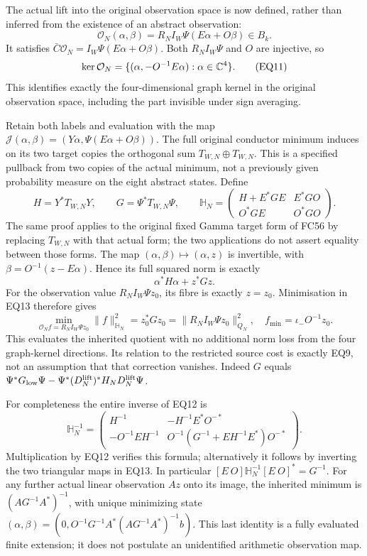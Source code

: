 \documentclass[11pt]{article}
\begin{document}
The actual lift into the original observation space is now defined,
rather than inferred from the existence of an abstract observation:
\[
 \mathcal O_N(\alpha,\beta)=R_NI_W\Psi(E\alpha+O\beta)\in B_k.
                                                                    \tag{EQ10}
\]
It satisfies $\bar C\mathcal O_N=I_W\Psi(E\alpha+O\beta)$.
Both $R_NI_W\Psi$ and $O$ are injective, so
\[
 \ker\mathcal O_N=\{(\alpha,-O^{-1}E\alpha):\alpha\in\mathbb C^4\}.
                                                                    \tag{EQ11}
\]
This identifies exactly the four-dimensional graph kernel in the
original observation space, including the part invisible under sign
averaging.

Retain both labels and evaluation with the map
$\mathcal J(\alpha,\beta)=(Y\alpha,\Psi(E\alpha+O\beta))$.
The full original conductor minimum induces on its two target copies
the orthogonal sum $T_{W,N}\oplus T_{W,N}$. This is a specified
pullback from two copies of the actual minimum, not a previously
given probability measure on the eight abstract states. Define
\[
 H=Y^*T_{W,N}Y,\qquad G=\Psi^*T_{W,N}\Psi,
 \qquad
 \mathbb H_N=\begin{pmatrix}
 H+E^*GE&E^*GO\\O^*GE&O^*GO
 \end{pmatrix}.                                                     \tag{EQ12}
\]
The same proof applies to the original fixed Gamma target form
of FC56 by replacing $T_{W,N}$ with that actual form; the two
applications do not assert equality between those forms.
The map $(\alpha,\beta)\mapsto(\alpha,z)$ is invertible, with
$\beta=O^{-1}(z-E\alpha)$. Hence its full squared norm is exactly
\[
 \alpha^*H\alpha+z^*Gz.                                             \tag{EQ13}
\]
For the observation value $R_NI_W\Psi z_0$, its fibre is exactly
$z=z_0$. Minimisation in EQ13 therefore gives
\[
 \boxed{\min_{\mathcal O_N f=R_NI_W\Psi z_0}\|f\|_{\mathbb H_N}^2
       =z_0^*Gz_0=\|R_NI_W\Psi z_0\|_{Q_N}^2,\quad
       f_{\min}=\iota_-O^{-1}z_0.}                                  \tag{EQ14}
\]
This evaluates the inherited quotient with no additional norm loss
from the four graph-kernel directions. Its relation to the restricted
source cost is exactly EQ9, not an assumption that that correction
vanishes. Indeed $G$ equals
$\Psi^*G_{\rm low}\Psi-\Psi^*(D_N^{\rm lift})^*H_ND_N^{\rm lift}\Psi$.

For completeness the entire inverse of EQ12 is
\[
 \mathbb H_N^{-1}=
 \begin{pmatrix}
 H^{-1}&-H^{-1}E^*O^{-*}\\
 -O^{-1}EH^{-1}&O^{-1}(G^{-1}+EH^{-1}E^*)O^{-*}
 \end{pmatrix}.                                                     \tag{EQ15}
\]
Multiplication by EQ12 verifies this formula; alternatively it
follows by inverting the two triangular maps in EQ13.
In particular $[E\ O]\mathbb H_N^{-1}[E\ O]^*=G^{-1}$.
For any further actual linear observation $A z$ onto its image,
the inherited minimum is $(AG^{-1}A^*)^{-1}$, with unique minimizing
state $(\alpha,\beta)=(0,O^{-1}G^{-1}A^*(AG^{-1}A^*)^{-1}b)$.
This last identity is a fully evaluated finite extension; it does not
postulate an unidentified arithmetic observation map.
\end{document}
